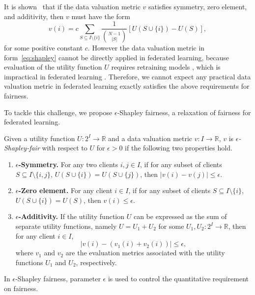 It is shown~\cite{dubey1975uniqueness,ghorbani2019data} that if the data valuation metric $v$ satisfies symmetry, zero element, and additivity, then $v$ must have the form
\begin{equation} \label{eq:shapley}
    v(i) = c \sum\limits_{S \subseteq I \setminus\{i\}} \frac{1}{\binom{N-1}{|S|}} \left[U(S\cup\{i\}) - U(S)\right],
\end{equation}
for some positive constant $c$. However the data valuation metric in form~\eqref{eq:shapley} cannot be directly applied in federated learning, because evaluation of the utility function $U$ requires retraining models \cite{ghorbani2019data}, which is impractical in federated learning \cite{wang2020principled}. Therefore, we cannot expect any practical data valuation metric in federated learning exactly satisfies the above requirements for fairness. 

To tackle this challenge, we propose $\epsilon$-Shapley fairness, a relaxation of fairness for federated learning.

\begin{definition} \label{def:fairness}
    Given a utility function $U:2^I \to \mathbb{R}$ and a data valuation metric $v: I \to \mathbb{R}$, $v$ is \emph{$\epsilon$-Shapley-fair} with respect to $U$ for $\epsilon > 0$ if the following two properties hold.
    \begin{enumerate}
    \item \textbf{$\epsilon$-Symmetry.} For any two clients $i, j \in I$, if for any subset of clients $S \subseteq I \setminus \{i,j\}$, $U(S \cup \{i\}) = U(S \cup \{j\})$, then $|v(i) - v(j)| \leq \epsilon$. 
    \item \textbf{$\epsilon$-Zero element.} For any client $i \in I$, if for any subset of clients $S \subseteq I \setminus \{i\}$, $U(S \cup \{i\}) = U(S)$, then $v(i) \leq \epsilon$.
    \item \textbf{$\epsilon$-Additivity.} If the utility function $U$ can be expressed as the sum of separate utility functions, namely $U = U_1 + U_2$ for some $U_1, U_2 : 2^I \to \mathbb{R}$, then for any client $i \in I$, 
    \[|v(i) - (v_1(i)  + v_2(i))| \leq \epsilon,\]
    where $v_1$ and $v_2$ are the evaluation metrics associated with the utility functions $U_1$ and $U_2$, respectively. 
\end{enumerate}
\end{definition}
In $\epsilon$-Shapley fairness, parameter $\epsilon$ is used to control the quantitative requirement on fairness. 

